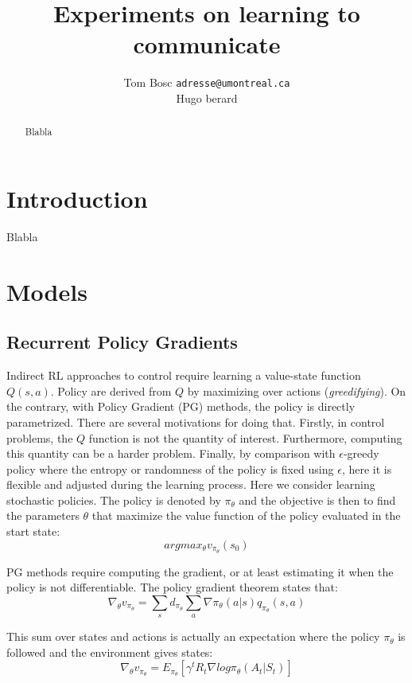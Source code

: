 \documentclass{article} %
\title{Experiments on learning to communicate}
\author{
Tom Bosc
\texttt{adresse@umontreal.ca} \\
Hugo berard
}
\begin{document}
\maketitle

\begin{abstract}
Blabla
\end{abstract}

\section{Introduction}
Blabla\cite{mordatch2017emergence}
\section{Models}
\subsection{Recurrent Policy Gradients}
Indirect RL approaches to control require learning a value-state function $Q(s,a)$. Policy are derived from $Q$ by maximizing over actions (\textit{greedifying}). On the contrary, with Policy Gradient (PG) methods, the policy is directly parametrized. There are several motivations for doing that\cite{sutton1998reinforcement}. Firstly, in control problems, the $Q$ function is not the quantity of interest. Furthermore, computing this quantity can be a harder problem. Finally, by comparison with $\epsilon$-greedy policy where the entropy or randomness of the policy is fixed using $\epsilon$, here it is flexible and adjusted during the learning process. Here we consider learning stochastic policies. The policy is denoted by $\pi_{\theta}$ and the objective is then to find the parameters $\theta$ that maximize the value function of the policy evaluated in the start state:
$$
argmax_{\theta} v_{\pi_{\theta}}(s_0)
$$

PG methods require computing the gradient, or at least estimating it when the policy is not differentiable. The policy gradient theorem states that:
$$
\nabla_{\theta} v_{\pi_{\theta}} = \sum_s d_{\pi_{\theta}} \sum_a \nabla \pi_{\theta}(a|s) q_{\pi_{\theta}}(s,a) %
$$

This sum over states and actions is actually an expectation where the policy $\pi_{\theta}$ is followed and the environment gives states:
$$
\nabla_{\theta} v_{\pi_{\theta}} = E_{\pi_{\theta}}[\gamma^t R_t \nabla log \pi_{\theta}(A_t|S_t)] %
$$
\end{document}
